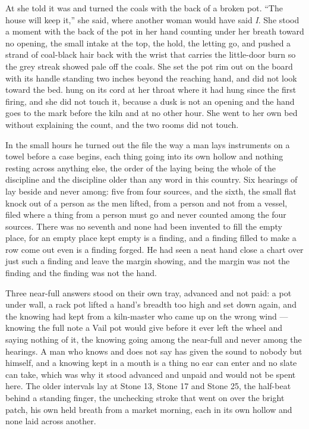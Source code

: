 At  she told  it was  and turned the coals with the back of a broken pot. “The house will keep it,” she said, where another woman would have said \emph{I}. She stood a moment with the back of the pot in her hand counting under her breath toward no opening, the small intake at the top, the hold, the letting go, and pushed a strand of coal-black hair back with the wrist that carries the little-door burn so the grey streak showed pale off the coals. She set the pot rim out on the board with its handle standing two inches beyond the reaching hand, and did not look toward the bed.  hung on its cord at her throat where it had hung since the first firing, and she did not touch it, because a dusk is not an opening and the hand goes to the mark before the kiln and at no other hour. She went to her own bed without explaining the count, and the two rooms did not touch.

\scenebreak

In the small hours he turned out the file the way a man lays instruments on a towel before a case begins, each thing going into its own hollow and nothing resting across anything else, the order of the laying being the whole of the discipline and the discipline older than any word in this country. Six hearings of  lay beside and never among: five from four sources, and the sixth, the small flat knock out of a person as the men lifted, from a person and not from a vessel, filed where a thing from a person must go and never counted among the four sources. There was no seventh and none had been invented to fill the empty place, for an empty place kept empty is a finding, and a finding filled to make a row come out even is a finding forged. He had seen a neat hand close a chart over just such a finding and leave the margin showing, and the margin was not the finding and the finding was not the hand.

Three near-full answers stood on their own tray, advanced and not paid: a pot under  wall, a rack pot lifted a hand's breadth too high and set down again, and the knowing  had kept from a kiln-master who came up on the wrong wind --- knowing the full note a Vail pot would give before it ever left the wheel and saying nothing of it, the knowing going among the near-full and never among the hearings. A man who knows and does not say has given the sound to nobody but himself, and a knowing kept in a mouth is a thing no ear can enter and no slate can take, which was why it stood advanced and unpaid and would not be spent here. The older intervals lay at Stone 13, Stone 17 and Stone 25, the half-beat behind a standing finger, the unchecking stroke that went on over the bright patch, his own held breath from a market morning, each in its own hollow and none laid across another.

